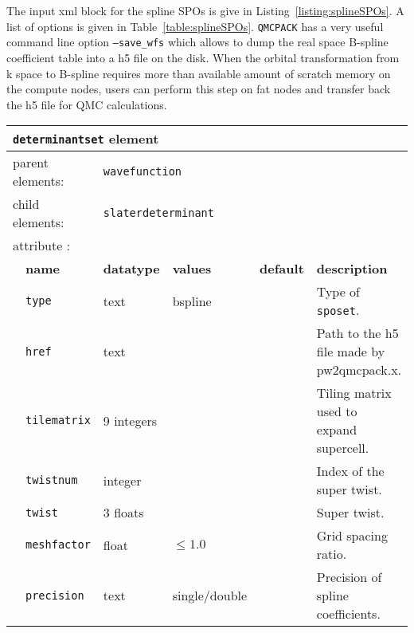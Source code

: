 The input xml block for the spline SPOs is give in Listing~\ref{listing:splineSPOs}. A list of options is given in 
Table~\ref{table:splineSPOs}. \texttt{QMCPACK} has a very useful command line option \texttt{--save\_wfs} which allows to dump 
the real space B-spline coefficient table into a h5 file on the disk.
When the orbital transformation from k space to B-spline requires more than available amount of scratch memory on the compute nodes, 
users can perform this step on fat nodes and transfer back the h5 file for QMC calculations.

\begin{table}[h]
\begin{center}
\begin{tabularx}{\textwidth}{l l l l l l }
\hline
\multicolumn{6}{l}{\texttt{determinantset} element} \\
\hline
\multicolumn{2}{l}{parent elements:} & \multicolumn{4}{l}{\texttt{wavefunction}}\\
\multicolumn{2}{l}{child  elements:} & \multicolumn{4}{l}{\texttt{slaterdeterminant}}\\
\multicolumn{2}{l}{attribute      :} & \multicolumn{4}{l}{}\\
   &   \bfseries name                   & \bfseries datatype & \bfseries values & \bfseries default & \bfseries description \\
   &   \texttt{type}                    &  text              &   bspline        &                   &  Type of \texttt{sposet}. \\
   &   \texttt{href}                    &  text              &                  &                   &  Path to the h5 file made by pw2qmcpack.x. \\
   &   \texttt{tilematrix}              &  9 integers        &                  &                   &  Tiling matrix used to expand supercell. \\
   &   \texttt{twistnum}                &  integer           &                  &                   &  Index of the super twist. \\
   &   \texttt{twist}                   &  3 floats          &                  &                   &  Super twist. \\
   &   \texttt{meshfactor}              &  float             &  $\le 1.0$       &                   &  Grid spacing ratio. \\
   &   \texttt{precision}               &  text              &  single/double   &                   &  Precision of spline coefficients. \\

\end{tabularx}
\end{center}
\end{table}

